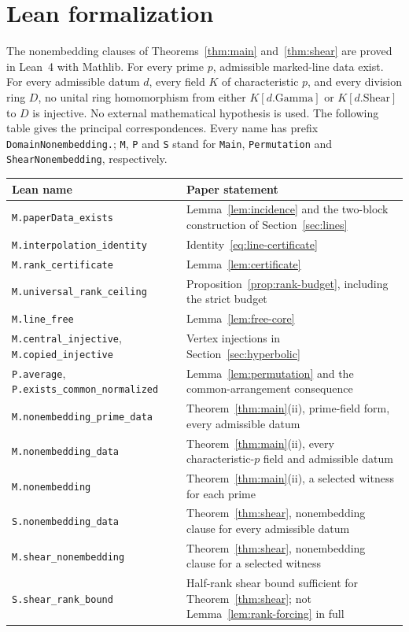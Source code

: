 \section{Lean formalization}\label{app:lean}

The nonembedding clauses of Theorems~\ref{thm:main} and~\ref{thm:shear}
are proved in Lean~4 with Mathlib. For every prime \(p\), admissible
marked-line data exist. For every admissible datum \(d\), every field
\(K\) of characteristic \(p\), and every division ring \(D\), no unital
ring homomorphism from either \(K[d.\mathrm{Gamma}]\) or
\(K[d.\mathrm{Shear}]\) to \(D\) is injective. No external mathematical
hypothesis is used. The following table gives the principal
correspondences. Every name has prefix \texttt{DomainNonembedding.};
\texttt{M}, \texttt{P} and \texttt{S} stand for \texttt{Main},
\texttt{Permutation} and \texttt{ShearNonembedding}, respectively.

\begin{center}
\small
\renewcommand{\arraystretch}{1.18}
\begin{tabular}{@{}p{6.2cm}p{8.8cm}@{}}
\textbf{Lean name} & \textbf{Paper statement} \\
\hline
\texttt{M.paperData\_exists} & Lemma~\ref{lem:incidence} and the two-block construction of Section~\ref{sec:lines} \\
\texttt{M.interpolation\_identity} & Identity~\eqref{eq:line-certificate} \\
\texttt{M.rank\_certificate} & Lemma~\ref{lem:certificate} \\
\texttt{M.universal\_rank\_ceiling} & Proposition~\ref{prop:rank-budget}, including the strict budget \\
\texttt{M.line\_free} & Lemma~\ref{lem:free-core} \\
\texttt{M.central\_injective},\newline
\texttt{M.copied\_injective} & Vertex injections in Section~\ref{sec:hyperbolic} \\
\texttt{P.average},\newline
\texttt{P.exists\_common\_normalized} & Lemma~\ref{lem:permutation} and the common-arrangement consequence \\
\texttt{M.nonembedding\_prime\_data} & Theorem~\ref{thm:main}(ii), prime-field form, every admissible datum \\
\texttt{M.nonembedding\_data} & Theorem~\ref{thm:main}(ii), every characteristic-\(p\) field and admissible datum \\
\texttt{M.nonembedding} & Theorem~\ref{thm:main}(ii), a selected witness for each prime \\
\texttt{S.nonembedding\_data} & Theorem~\ref{thm:shear}, nonembedding clause for every admissible datum \\
\texttt{M.shear\_nonembedding} & Theorem~\ref{thm:shear}, nonembedding clause for a selected witness \\
\texttt{S.shear\_rank\_bound} & Half-rank shear bound sufficient for Theorem~\ref{thm:shear}; not Lemma~\ref{lem:rank-forcing} in full
\end{tabular}
\end{center}

